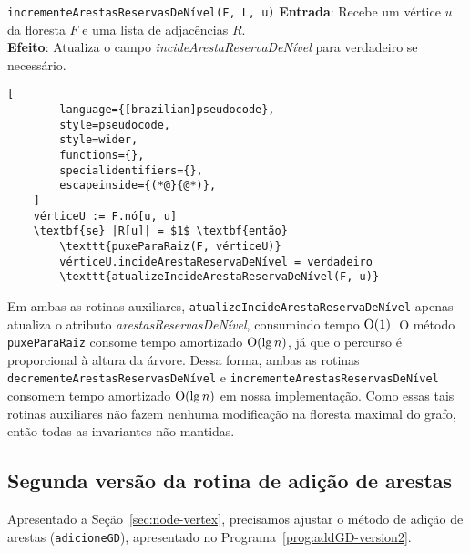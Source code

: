 \begin{programruledcaption}{\texttt{incrementeArestasReservasDeNível(F, L, u)} \label{prog:incrementReserveEdgesCount-GD}}
    \noindent\textbf{Entrada}: Recebe um vértice $u$ da floresta $F$ e uma lista de adjacências $R$.\\
    \noindent\textbf{Efeito}: Atualiza o campo \textit{incideArestaReservaDeNível} para verdadeiro se necessário.
    \vspace{-0.5\baselineskip}
    \begin{lstlisting}[
        language={[brazilian]pseudocode},
        style=pseudocode,
        style=wider,
        functions={},
        specialidentifiers={},
        escapeinside={(*@}{@*)},
    ]
    vérticeU := F.nó[u, u]
    \textbf{se} |R[u]| = $1$ \textbf{então} 
        \texttt{puxeParaRaiz(F, vérticeU)}
        vérticeU.incideArestaReservaDeNível = verdadeiro
        \texttt{atualizeIncideArestaReservaDeNível(F, u)}
    \end{lstlisting}
    \vspace{-0.5\baselineskip}
\end{programruledcaption}


 Em ambas as rotinas auxiliares, \texttt{atualizeIncideArestaReservaDeNível} apenas atualiza o atributo \textit{arestasReservasDeNível}, consumindo tempo $\mathrm{O}(1)$. O método \texttt{puxeParaRaiz} consome tempo amortizado $\mathrm{O}(\lg n)$, já que o percurso é proporcional à altura da árvore. Dessa forma, ambas as rotinas \texttt{decrementeArestasReservasDeNível} e \texttt{incrementeArestasReservasDeNível} consomem tempo amortizado $\mathrm{O}(\lg n)$ em nossa implementação.
Como essas tais rotinas auxiliares não fazem nenhuma modificação na floresta maximal do grafo, então todas as invariantes não mantidas. 

\subsection{Segunda versão da rotina de adição de arestas}
\label{sec:code-edge-addition-second-version}

Apresentado a Seção~\ref{sec:node-vertex}, precisamos ajustar o método de adição de arestas (\texttt{adicioneGD}), apresentado no Programa~\ref{prog:addGD-version2}. 

